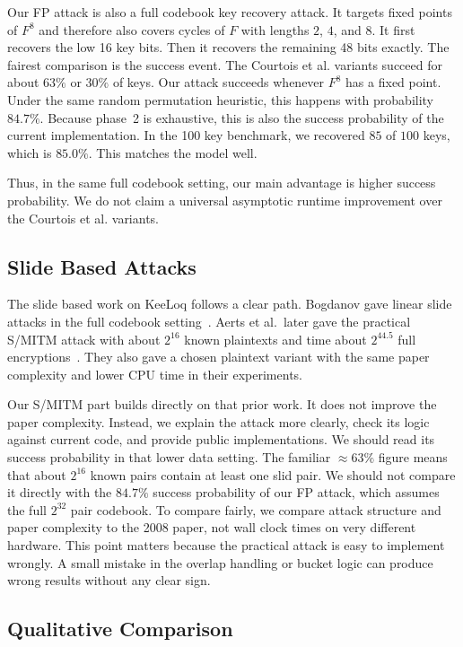 \documentclass[version=preprint]{iacrcc}
\begin{document}
Our FP attack is also a full codebook key recovery attack.
It targets fixed points of $F^8$ and therefore also covers cycles of $F$ with lengths $2$, $4$, and $8$.
It first recovers the low 16 key bits.
Then it recovers the remaining 48 bits exactly.
The fairest comparison is the success event.
The Courtois et al. variants succeed for about $63\%$ or $30\%$ of keys.
Our attack succeeds whenever $F^8$ has a fixed point.
Under the same random permutation heuristic, this happens with probability
$84.7\%$.
Because phase~2 is exhaustive, this is also the success probability of the current implementation.
In the 100 key benchmark, we recovered $85$ of $100$ keys, which is $85.0\%$.
This matches the model well.

Thus, in the same full codebook setting, our main advantage is higher success probability.
We do not claim a universal asymptotic runtime improvement over the Courtois et al. variants.

\subsection{Slide Based Attacks}

The slide based work on KeeLoq follows a clear path.
Bogdanov gave linear slide attacks in the full codebook setting~\cite{bogdanov2007linear}.
Aerts et al.\ later gave the practical S/MITM attack with about $2^{16}$ known plaintexts and time about $2^{44.5}$ full encryptions~\cite{indesteege2008practical}.
They also gave a chosen plaintext variant with the same paper complexity and lower CPU time in their experiments.

Our S/MITM part builds directly on that prior work.
It does not improve the paper complexity.
Instead, we explain the attack more clearly, check its logic against current code, and provide public implementations.
We should read its success probability in that lower data setting.
The familiar $\approx 63\%$ figure means that about $2^{16}$ known pairs contain at least one slid pair.
We should not compare it directly with the $84.7\%$ success probability of our FP attack, which assumes the full $2^{32}$ pair codebook.
To compare fairly, we compare attack structure and paper complexity to the 2008 paper, not wall clock times on very different hardware.
This point matters because the practical attack is easy to implement wrongly.
A small mistake in the overlap handling or bucket logic can produce wrong results without any clear sign.

\subsection{Qualitative Comparison}
\end{document}
